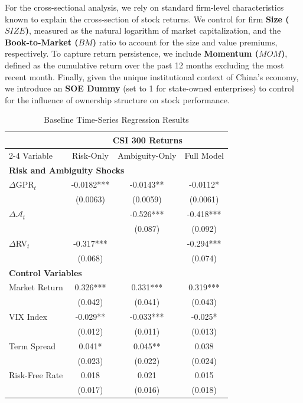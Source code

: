 \documentclass[preprint,12pt,authoryear]{elsarticle}
\begin{document}
For the cross-sectional analysis, we rely on standard firm-level characteristics known to explain the cross-section of stock returns. We control for firm \textbf{Size ($SIZE$)}, measured as the natural logarithm of market capitalization, and the \textbf{Book-to-Market ($BM$)} ratio to account for the size and value premiums, respectively. To capture return persistence, we include \textbf{Momentum ($MOM$)}, defined as the cumulative return over the past 12 months excluding the most recent month. Finally, given the unique institutional context of China's economy, we introduce an \textbf{SOE Dummy} (set to 1 for state-owned enterprises) to control for the influence of ownership structure on stock performance.

\begin{table}[htbp]
\centering
\caption{Baseline Time-Series Regression Results}
\label{tab:baseline_ts}
\begin{threeparttable}
\begin{tabular*}{\textwidth}{@{\extracolsep{\fill}} lccc @{\extracolsep{\fill}}}
\toprule
& \multicolumn{3}{c}{CSI 300 Returns} \\
\cmidrule(lr){2-4}
Variable & Risk-Only & Ambiguity-Only & Full Model \\
\midrule
\midrule
\multicolumn{4}{l}{\textbf{Risk and Ambiguity Shocks}} \\
$\Delta$GPR$_t$ & -0.0182*** & -0.0143** & -0.0112* \\
& (0.0063) & (0.0059) & (0.0061) \\
$\Delta \mathcal{A}_{t}$ &  & -0.526*** & -0.418*** \\
&  & (0.087) & (0.092) \\
$\Delta$RV$_t$ & -0.317*** &  & -0.294*** \\
& (0.068) &   & (0.074) \\
\midrule
\multicolumn{4}{l}{\textbf{Control Variables}} \\
Market Return & 0.326*** & 0.331*** & 0.319*** \\
& (0.042) & (0.041) & (0.043) \\
VIX Index & -0.029** & -0.033*** & -0.025* \\
& (0.012) & (0.011) & (0.013) \\
Term Spread & 0.041* & 0.045** & 0.038 \\
& (0.023) & (0.022) & (0.024) \\
Risk-Free Rate & 0.018 & 0.021 & 0.015 \\
& (0.017) & (0.016) & (0.018) \\

\end{tabular*}
\end{threeparttable}
\end{table}
\end{document}

